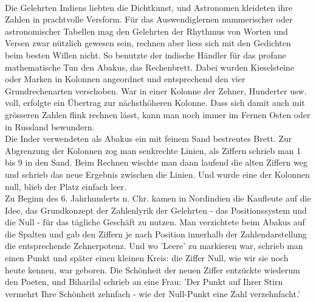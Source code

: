 \documentclass[%
11pt,%
twoside,%
titlepage,%
german,%
headsepline%
]{scrartcl}
\begin{document}
\begin{multicols}{2}
\\
Die Gelehrten Indiens liebten die Dichtkunst, und Astronomen kleideten ihre Zahlen in prachtvolle Versform. Für das Auswendiglernen nummerischer oder astronomischer Tabellen mag den Gelehrten der Rhythmus von Worten und Versen zwar nützlich gewesen sein, rechnen aber liess sich mit den Gedichten beim besten Willen nicht. So benutzte der indische Händler für das profane mathematische Tun den Abakus, das Rechenbrett. Dabei wurden Kieselsteine oder Marken in Kolonnen angeordnet und entsprechend den vier Grundrechenarten verschoben. War in einer Kolonne der Zehner, Hunderter usw. voll, erfolgte ein Übertrag zur nächsthöheren Kolonne. Dass sich damit auch mit grösseren Zahlen flink rechnen lässt, kann man noch immer im Fernen Osten oder in Russland bewundern.
\\
Die Inder verwendeten als Abakus ein mit feinem Sand bestreutes Brett. Zur Abgrenzung der Kolonnen zog man senkrechte Linien, als Ziffern schrieb man 1 bis 9 in den Sand. Beim Rechnen wischte man dann laufend die alten Ziffern weg und schrieb das neue Ergebnis zwischen die Linien. Und wurde eine der Kolonnen null, blieb der Platz einfach leer.
\\
Zu Beginn des 6. Jahrhunderts n. Chr. kamen in Nordindien die Kaufleute auf die Idee, das Grundkonzept der Zahlenlyrik der Gelehrten - das Positionssystem und die Null - für das tägliche Geschäft zu nutzen. Man verzichtete beim Abakus auf die Spalten und gab den Ziffern je nach Position innerhalb der Zahlendarstellung die entsprechende Zehnerpotenz. Und wo 'Leere' zu markieren war, schrieb man einen Punkt und später einen kleinen Kreis: die Ziffer Null, wie wir sie noch heute kennen, war geboren. Die Schönheit der neuen Ziffer entzückte wiederum den Poeten, und Biharilal schrieb an eine Frau: 'Der Punkt auf Ihrer Stirn vermehrt Ihre Schönheit zehnfach - wie der Null-Punkt eine Zahl verzehnfacht.'
\\

\end{multicols}
\end{document}

